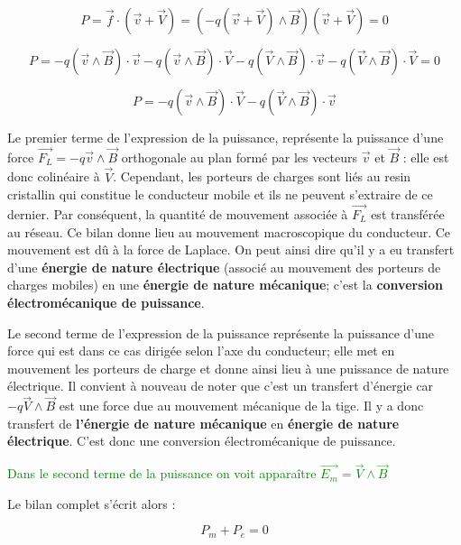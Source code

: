 \documentclass{article}
\begin{document}
\begin{equation}
    P = \vec{f} \cdot (\vec{v} + \vec{V}) = (-q(\vec{v} + \vec{V})\land \vec{B} ) (\vec{v} + \vec{V}) = 0
\end{equation}

\begin{equation}
P = -q ( \vec{v}  \land \vec{B} ) \cdot \vec{v} -q( \vec{v}  \land \vec{B} ) \cdot \vec{V} -q ( \vec{V}  \land \vec{B} ) \cdot \vec{v} -q ( \vec{V}  \land \vec{B} ) \cdot \vec{V} = 0
\end{equation}

\begin{equation}
    P = -q (\vec{v}  \land \vec{B} ) \cdot \vec{V} -q ( \vec{V}  \land \vec{B} ) \cdot \vec{v}
\end{equation}

Le premier terme de l'expression de la puissance, représente la puissance d'une force $\vec{F_L} = -q \vec{v} \land \vec{B} $ orthogonale au plan formé par les vecteurs $\vec{v}$ et $\vec{B}$ : elle est donc colinéaire à $\vec{V}$. Cependant, les porteurs de charges sont liés au resin cristallin qui constitue le conducteur mobile et ils ne peuvent s'extraire de ce dernier. Par conséquent, la quantité de mouvement associée à $\vec{F_L}$ est transférée au réseau. Ce bilan donne lieu au mouvement macroscopique du conducteur. Ce mouvement est dû à la force de Laplace. On peut ainsi dire qu'il y a eu transfert d'une \textbf{énergie de nature électrique} (associé au mouvement des porteurs de charges mobiles) en une \textbf{énergie de nature mécanique}; c'est la \textbf{conversion électromécanique de puissance}. \medskip

Le second terme de l'expression de la puissance représente la puissance d'une force qui est dans ce cas dirigée selon l'axe du conducteur; elle met en mouvement les porteurs de charge et donne ainsi lieu à une puissance de nature électrique. Il convient à nouveau de noter que c'est un transfert d'énergie car $-q\vec{V}\land \vec{B}$ est une force due au mouvement mécanique de la tige. Il y a donc transfert de \textbf{l'énergie de nature mécanique} en \textbf{énergie de nature électrique}. C'est donc une conversion électromécanique de puissance.\medskip

\textcolor{green}{Dans le second terme de la puissance on voit apparaître $\vec{E_m}=\vec{V} \land \vec{B}$}

Le bilan complet s'écrit alors :

\begin{equation}
    P_m + P_e = 0
\end{equation}
\end{document}

